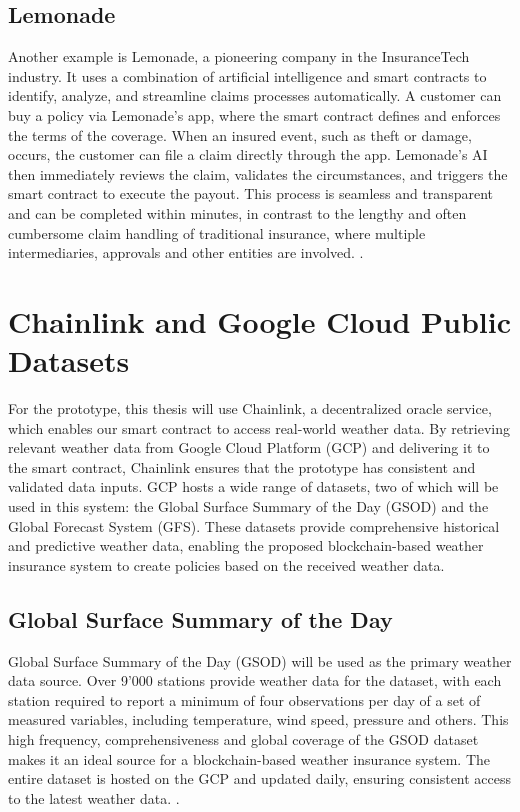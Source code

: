 \subsection{Lemonade}
Another example is Lemonade, a pioneering company in the InsuranceTech industry. It uses a combination of artificial intelligence and smart contracts to identify, analyze, and streamline claims processes automatically. A customer can buy a policy via Lemonade's app, where the smart contract defines and enforces the terms of the coverage. When an insured event, such as theft or damage, occurs, the customer can file a claim directly through the app. Lemonade's AI then immediately reviews the claim, validates the circumstances, and triggers the smart contract to execute the payout. This process is seamless and transparent and can be completed within minutes, in contrast to the lengthy and often cumbersome claim handling of traditional insurance, where multiple intermediaries, approvals and other entities are involved. \autocites{la2023insurtech}{tardieu2020case}.
 
\section{Chainlink and Google Cloud Public Datasets}\label{section:chainlink_google_cloud_datasets}
For the prototype, this thesis will use Chainlink, a decentralized oracle service, which enables our smart contract to access real-world weather data. By retrieving relevant weather data from Google Cloud Platform (GCP) and delivering it to the smart contract, Chainlink ensures that the prototype has consistent and validated data inputs. GCP hosts a wide range of datasets, two of which will be used in this system: the Global Surface Summary of the Day (GSOD) and the Global Forecast System (GFS). These datasets provide comprehensive historical and predictive weather data, enabling the proposed blockchain-based weather insurance system to create policies based on the received weather data.

\subsection{Global Surface Summary of the Day}\label{GSOD}
Global Surface Summary of the Day (GSOD) will be used as the primary weather data source. Over 9'000 stations provide weather data for the dataset, with each station required to report a minimum of four observations per day of a set of measured variables, including temperature, wind speed, pressure and others. This high frequency, comprehensiveness and global coverage of the GSOD dataset makes it an ideal source for a blockchain-based weather insurance system. The entire dataset is hosted on the GCP and updated daily, ensuring consistent access to the latest weather data. \autocite{NOAA_GSOD_2023}.

